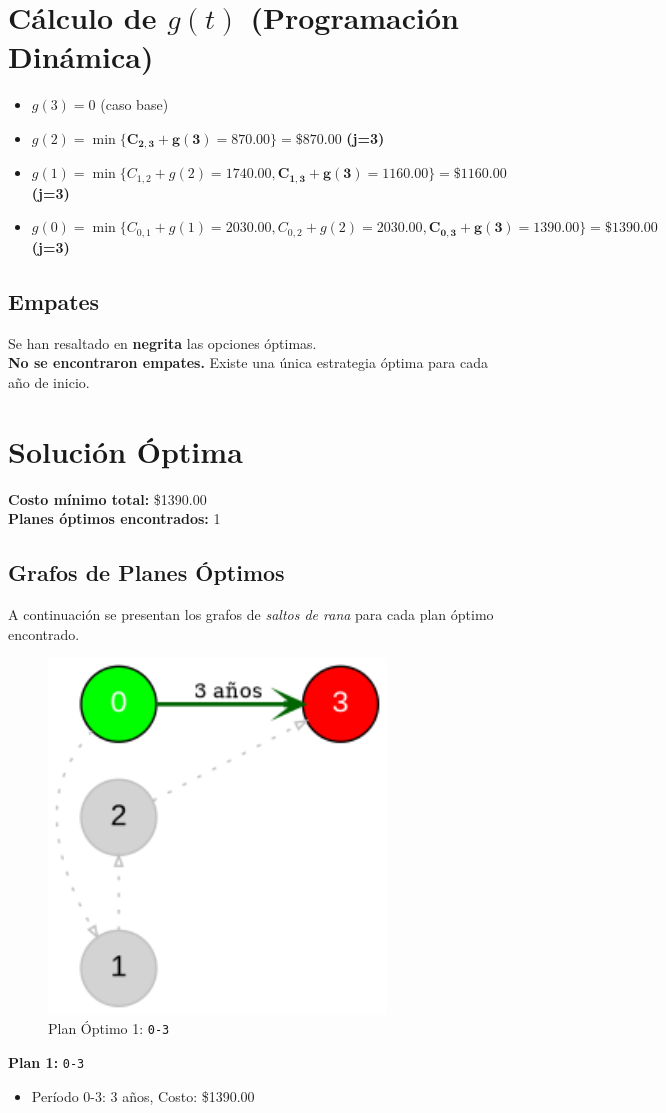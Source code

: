 \documentclass[12pt]{article}
\begin{document}
\clearpage
\section*{Cálculo de $g(t)$ (Programación Dinámica)}
\begin{itemize}
\item $g(3) = 0$ (caso base)
\item $g(2) = \min\{ \mathbf{C_{2,3} + g(3) = 870.00}\} = \$870.00$ \textbf{(j=3)}
\item $g(1) = \min\{ C_{1,2} + g(2) = 1740.00, \mathbf{C_{1,3} + g(3) = 1160.00}\} = \$1160.00$ \textbf{(j=3)}
\item $g(0) = \min\{ C_{0,1} + g(1) = 2030.00, C_{0,2} + g(2) = 2030.00, \mathbf{C_{0,3} + g(3) = 1390.00}\} = \$1390.00$ \textbf{(j=3)}
\end{itemize}

\subsection*{Empates}
Se han resaltado en \textbf{negrita} las opciones óptimas.\\
\textbf{No se encontraron empates.} Existe una única estrategia óptima para cada año de inicio.\\
\clearpage
\section*{Solución Óptima}
\textbf{Costo mínimo total:} \$1390.00\\
\textbf{Planes óptimos encontrados:} 1
\subsection*{Grafos de Planes Óptimos}
A continuación se presentan los grafos de \emph{saltos de rana} para cada plan óptimo encontrado.

\begin{figure}[H]
\centering
\includegraphics[width=0.8\textwidth]{bici_plan_1.png}
\caption{Plan Óptimo 1: \texttt{0-3}}
\label{fig:plan1}
\end{figure}

\textbf{Plan 1:} \texttt{0-3}
\begin{itemize}\small
\item Período 0-3: 3 años, Costo: \$1390.00
\end{itemize}
\end{document}
